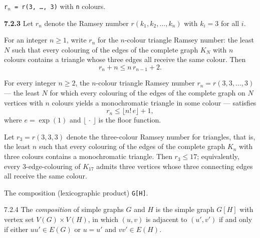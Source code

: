 \begin{definition}[$r_{n} = r(3, \dots, 3)$ with $n$ colours]
\label{SimpleGraph.ramseyTriangle}
\leanok
{}
\texttt{r$_{n}$ = r(3, \dots{}, 3)} with \texttt{n} colours.

\textbf{7.2.3} Let $r_n$ denote the Ramsey number $r(k_1, k_2, \ldots, k_n)$ with
$k_i = 3$ for all $i$.
\end{definition}

\begin{theorem}
\label{SimpleGraph.ramseyTriangle_recursion}
For an integer $n \ge 1$, write $r_n$ for the $n$-colour triangle Ramsey number: the
least $N$ such that every colouring of the edges of the complete graph $K_N$ with $n$
colours contains a triangle whose three edges all receive the same colour. Then
\[
r_n + n \le n\,r_{n-1} + 2 .
\]
\end{theorem}

\begin{theorem}
\label{SimpleGraph.ramseyTriangle_le_factorial_exp}
For every integer $n \ge 2$, the $n$-colour triangle Ramsey number $r_n = r(3, 3, \dots,
3)$ — the least $N$ for which every colouring of the edges of the complete graph on $N$
vertices with $n$ colours yields a monochromatic triangle in some colour — satisfies
\[
  r_n \le \lfloor n!\, e \rfloor + 1,
\]
where $e = \exp(1)$ and $\lfloor\,\cdot\,\rfloor$ is the floor function.
\end{theorem}

\begin{theorem}
\label{SimpleGraph.ramseyTriangle_three_le}
Let $r_3 = r(3,3,3)$ denote the three-colour Ramsey number for triangles, that is, the
least $n$ such that every colouring of the edges of the complete graph $K_n$ with three
colours contains a monochromatic triangle. Then $r_3 \le 17$; equivalently, every
$3$-edge-colouring of $K_{17}$ admits three vertices whose three connecting edges all
receive the same colour.
\end{theorem}

\begin{definition}
\label{SimpleGraph.composition}
The composition (lexicographic product) \texttt{G[H]}.

7.2.4 The \emph{composition} of simple graphs $G$ and $H$ is the simple graph $G[H]$
with vertex set $V(G) \times V(H)$, in which $(u, v)$ is adjacent to
$(u', v')$ if and only if either $uu' \in E(G)$ or $u = u'$ and
$vv' \in E(H)$.
\end{definition}

